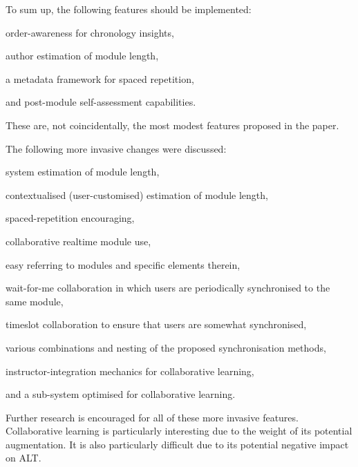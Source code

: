 To sum up, the following features should be implemented:
\begin{itemize*}
  \item order-awareness for chronology insights,
  \item author estimation of module length,
  \item a metadata framework for spaced repetition,
  \item and post-module self-assessment capabilities.
\end{itemize*}

These are, not coincidentally, the most modest features proposed in the paper.

The following more invasive changes were discussed:

\begin{itemize*}
  \item system estimation of module length,
  \item contextualised (user-customised) estimation of module length,
  \item spaced-repetition encouraging,
  \item collaborative realtime module use,
  \item easy referring to modules and specific elements therein,
  \item wait-for-me collaboration in which users are periodically synchronised 
  to the same module,
  \item timeslot collaboration to ensure that users are somewhat synchronised,
  \item various combinations and nesting of the proposed synchronisation 
  methods,
  \item instructor-integration mechanics for collaborative learning,
  \item and a sub-system optimised for collaborative learning.
\end{itemize*}

Further research is encouraged for all of these more invasive features. 
Collaborative learning is particularly interesting due to the weight of its 
potential augmentation. It is also particularly difficult due to its potential 
negative impact on ALT.
